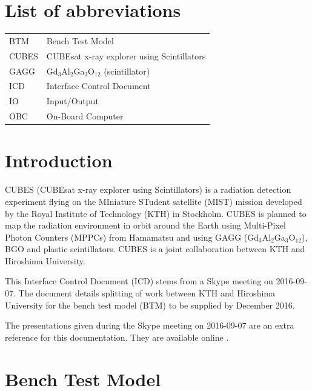 \documentclass[a4paper,11pt]{article}
\begin{document}
\section*{List of abbreviations}
\begin{tabular}{l l}

BTM & Bench Test Model \\
CUBES & CUBEsat x-ray explorer using Scintillators \\
GAGG & Gd$_3$Al$_2$Ga$_3$O$_{12}$ (scintillator) \\
ICD & Interface Control Document \\
IO & Input/Output \\
OBC & On-Board Computer \\

\end{tabular}

\pagebreak
\section{Introduction}
\label{sec:intro}

CUBES (CUBEsat x-ray explorer using Scintillators) is a radiation detection experiment
flying on the MIniature STudent satellite (MIST) mission developed by the Royal
Institute of Technology (KTH) in Stockholm. CUBES is planned to map the radiation
environment in orbit around the Earth using Multi-Pixel Photon Counters (MPPCs) from
Hamamatsu and using GAGG (Gd$_3$Al$_2$Ga$_3$O$_{12}$), BGO and plastic scintillators. 
CUBES is a joint collaboration between KTH and Hiroshima University.

This Interface Control Document (ICD) stems from a Skype meeting on 2016-09-07.
The document details splitting of work between KTH and Hiroshima University for the bench 
test model (BTM) to be supplied by December 2016.

The presentations given during the Skype meeting on 2016-09-07 are an extra reference
for this documentation. They are available online \cite{pres}.

\section{Bench Test Model}
\end{document}
